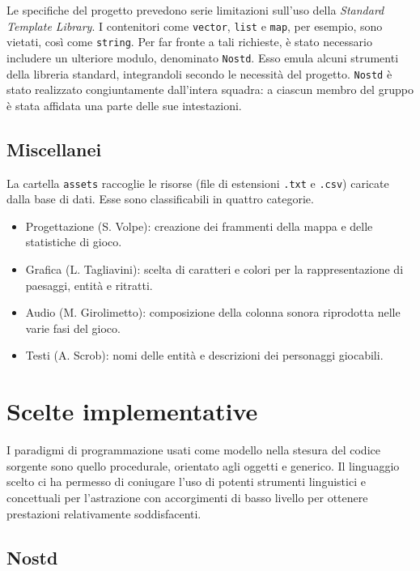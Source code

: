 \documentclass[a4paper]{article}
\begin{document}
Le specifiche del progetto prevedono serie limitazioni sull'uso della
\emph{Standard Template Library}. I contenitori come \verb!vector!, \verb!list!
e \verb!map!, per esempio, sono vietati, cos\`i come \verb!string!. Per far
fronte a tali richieste, \`e stato necessario includere un ulteriore modulo,
denominato \verb!Nostd!. Esso emula alcuni strumenti della libreria standard,
integrandoli secondo le necessit\`a del progetto. \verb!Nostd! \`e stato
realizzato congiuntamente dall'intera squadra: a ciascun membro del gruppo \`e
stata affidata una parte delle sue intestazioni.

\subsection{Miscellanei}

La cartella \verb!assets! raccoglie le risorse (file di estensioni \verb!.txt! e
\verb!.csv!) caricate dalla base di dati.
Esse sono classificabili in quattro categorie.

\begin{itemize}
  \item Progettazione (S. Volpe): creazione dei frammenti della mappa e delle
    statistiche di gioco.
  \item Grafica (L. Tagliavini): scelta di caratteri e colori per la
    rappresentazione di paesaggi, entit\`a e ritratti.
  \item Audio (M. Girolimetto): composizione della colonna sonora riprodotta
    nelle varie fasi del gioco.
  \item Testi (A. Scrob): nomi delle entit\`a e descrizioni dei personaggi
    giocabili.
\end{itemize}

\section{Scelte implementative}

I paradigmi di programmazione usati come modello nella stesura del codice
sorgente sono quello procedurale, orientato agli oggetti e generico. Il
linguaggio scelto ci ha permesso di coniugare l'uso di potenti strumenti
linguistici e concettuali per l'astrazione con accorgimenti di basso livello
per ottenere prestazioni relativamente soddisfacenti.

\subsection{Nostd}
\end{document}
